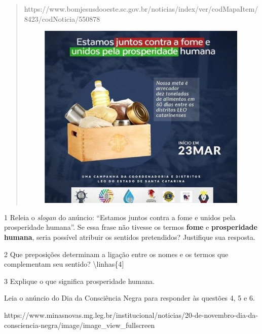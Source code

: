 \begin{itemize}
\begin{itemize}
{\begin{itemize}
\begin{itemize}
\begin{quote}
https://www.bomjesusdooeste.sc.gov.br/noticias/index/ver/codMapaItem/8423/codNoticia/550878

\begin{figure}
\centering
\includegraphics[width=3.95833in,height=3.54167in]{./_SAEB_9_POR/media/image31.jpeg}
\caption{}
\end{figure}
\end{quote}

\num{1} Releia o \emph{slogan} do anúncio: ``Estamos juntos contra a
fome e unidos pela prosperidade humana''. Se essa frase não tivesse os
termos \textbf{fome} e \textbf{prosperidade humana}, seria possível
atribuir os sentidos pretendidos? Justifique sua resposta. 

\num{2} Que preposições determinam a ligação entre os nomes e os termos
que complementam seu sentido? \textbackslash{}linhas\{4{]}

\num{3} Explique o que significa prosperidade humana. 

Leia o anúncio do Dia da Consciência Negra para responder às questões 4,
5 e 6.

https://www.minasnovas.mg.leg.br/institucional/noticias/20-de-novembro-dia-da-consciencia-negra/image/image\_view\_fullscreen


\end{itemize}
\end{itemize}}
\end{itemize}
\end{itemize}

